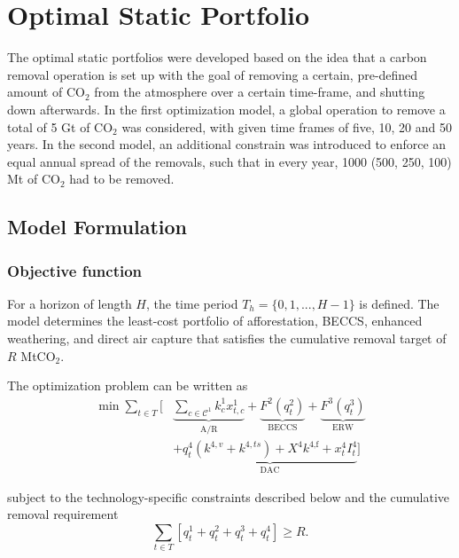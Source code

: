 \section{Optimal Static Portfolio}
The optimal static portfolios were developed based on the idea that a carbon removal operation is set up with the goal of removing a certain, pre-defined amount of CO$_2$ from the atmosphere over a certain time-frame, and shutting down afterwards. In the first optimization model, a global operation to remove a total of 5 Gt of CO$_2$ was considered, with given time frames of five, 10, 20 and 50 years. In the second model, an additional constrain was introduced to enforce an equal annual spread of the removals, such that in every year, 1000 (500, 250, 100) Mt of CO$_2$ had to be removed.\vspace{2mm}

\subsection{Model Formulation}
\subsubsection{Objective function}
For a horizon of length $H$, the time period $ T_h =  \{0,1,...,H-1\} $ is defined. The model determines the least-cost portfolio of afforestation, BECCS, enhanced weathering, and direct air capture that satisfies the cumulative removal target of $R$ MtCO$_2$.\vspace{2mm}

The optimization problem can be written as
\begin{equation}
\begin{aligned}
\min \sum_{t\in T} \Big[
& \underbrace{\sum_{c\in\mathcal{C}^{1}} k^1_c x_{t,c}^1}_{\text{A/R}} + \underbrace{F^2(q_t^2)}_{\text{BECCS}} + \underbrace{F^3(q_t^3)}_{\text{ERW}} \\[4pt]
& + \underbrace{
    q_t^4 (k^{4,v}  + k^{4,ts}) 
    + X^4 k^{\text{4,f}} 
    + x_t^4 I_t^4
}_{\text{DAC}}
\Big]
\end{aligned}
\end{equation}


subject to the technology-specific constraints described below and the cumulative removal requirement
\begin{equation}
\sum_{t\in T} \left[ q_t^1+q_t^2+q_t^3+q_t^4 \right] \geq R\text{.}
\end{equation}

